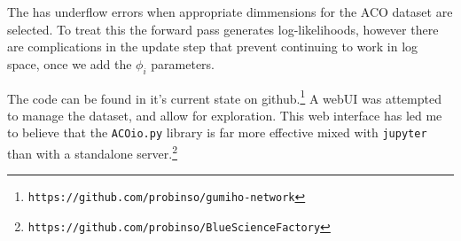 \documentclass{article}
\begin{document}
\begin{multicols}{2}
The \GMM has underflow errors when appropriate dimmensions for the ACO dataset are selected.
To treat this the forward pass generates log-likelihoods, however there are complications in
the update step that prevent continuing to work in log space, once we add the $\phi_i$
parameters.




The code can be found in it's current state on github.\footnote{\texttt{https://github.com/probinso/gumiho-network}}
A webUI was attempted to manage the dataset, and allow for exploration. This web interface
has led me to believe that the \texttt{ACOio.py} library is far more effective mixed with
\texttt{jupyter} than with a standalone server.\footnote{\texttt{https://github.com/probinso/BlueScienceFactory}}

{}


\end{multicols}
\end{document}
